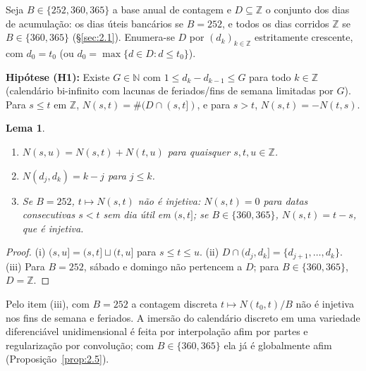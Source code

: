 \documentclass[11pt, a4paper]{article}
\theoremstyle{definition}
\theoremstyle{plain}
\newtheorem{lema}[definicao]{Lema}
\theoremstyle{remark}
\begin{document}
Seja $B \in \{252, 360, 365\}$ a base anual de contagem e $D \subseteq \mathbb{Z}$ o conjunto dos dias de acumulação: os dias úteis bancários se $B = 252$, e todos os dias corridos $\mathbb{Z}$ se $B \in \{360, 365\}$ (\S\ref{sec:2.1}). Enumera-se $D$ por $(d_k)_{k \in \mathbb{Z}}$ estritamente crescente, com $d_0 = t_0$ (ou $d_0 = \max\{d \in D : d \le t_0\}$).

\medskip\noindent\textbf{Hipótese (H1):} Existe $G \in \mathbb{N}$ com $1 \le d_k - d_{k-1} \le G$ para todo $k \in \mathbb{Z}$ (calendário bi-infinito com lacunas de feriados/fins de semana limitadas por $G$). Para $s \le t$ em $\mathbb{Z}$, $N(s,t) = \#(D \cap (s,t])$, e para $s > t$, $N(s,t) = -N(t,s)$.

\begin{lema}\label{lem:2.1}
\begin{enumerate}[label=(\roman*)]
    \item $N(s,u) = N(s,t) + N(t,u)$ para quaisquer $s, t, u \in \mathbb{Z}$.
    \item $N(d_j, d_k) = k - j$ para $j \le k$.
    \item Se $B = 252$, $t \mapsto N(s,t)$ não é injetiva: $N(s,t) = 0$ para datas consecutivas $s < t$ sem dia útil em $(s,t]$; se $B \in \{360, 365\}$, $N(s,t) = t - s$, que é injetiva.
\end{enumerate}
\end{lema}
\begin{proof}
(i) $(s,u] = (s,t] \sqcup (t,u]$ para $s \le t \le u$. (ii) $D \cap (d_j, d_k] = \{d_{j+1}, \dots, d_k\}$. (iii) Para $B = 252$, sábado e domingo não pertencem a $D$; para $B \in \{360, 365\}$, $D = \mathbb{Z}$.
\end{proof}

Pelo item (iii), com $B = 252$ a contagem discreta $t \mapsto N(t_0, t)/B$ não é injetiva nos fins de semana e feriados. A imersão do calendário discreto em uma variedade diferenciável unidimensional é feita por interpolação afim por partes e regularização por convolução; com $B \in \{360, 365\}$ ela já é globalmente afim (Proposição~\ref{prop:2.5}).
\end{document}
